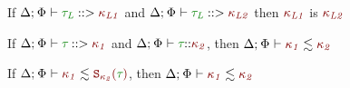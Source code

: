 \documentclass[11pt]{article}
\begin{document}
    \vphantom{.}
    \begin{lemma}[PK-Unicity]
        If $\PrincipalKind{\typ[L]}[\knd[L1]]$ and $\PrincipalKind{\typ[L]}[\knd[L2]]$ then ${\knd[L1]}$ is ${\knd[L2]}$
    \end{lemma}
    \begin{lemma}
        If $\PrincipalKind{\typ}[\knd[1]]$ and $\WellFormedAtKind{\typ}[\knd[2]]$, then $\ConsistentSubKind{\knd[1]}{\knd[2]}$
    \end{lemma}
    \begin{lemma}
        If $\ConsistentSubKind{\knd[1]}{\SKind[\knd[2]]}$, then $\ConsistentSubKind{\knd[1]}{\knd[2]}$
    \end{lemma}
\end{document}
